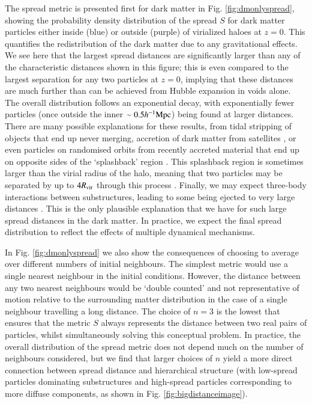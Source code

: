The spread metric is presented first for dark matter in Fig.
\ref{fig:dmonlyspread}, showing the probability density distribution of the
spread $S$ for dark matter particles either inside (blue) or outside (purple)
of virialized haloes at $z=0$. This quantifies the redistribution of the dark
matter due to any gravitational effects. We see here that the largest spread
distances are significantly larger than any of the characteristic distances
shown in this figure; this is even compared to the largest separation for any
two particles at $z=0$, implying that these distances are much further than
can be achieved from Hubble expansion in voids alone. The overall
distribution follows an exponential decay, with exponentially fewer particles
(once outside the inner $\sim 0.5 h^{-1}{\rm Mpc}{}$) being found at larger distances.
There are many possible explanations for these results, from tidal stripping
of objects that end up never merging, accretion of dark matter from
satellites \citep[see e.g. the effects in ][]{VandenBosch2018}, or even
particles on randomised orbits from recently accreted material that end up on
opposite sides of the `splashback' region \citep{Diemer2014, Adhikari2014}.
This splashback region is sometimes larger than the virial radius of the
halo, meaning that two particles may be separated by up to $4R_{\rm vir}$
through this process \citep{Diemer2017a}. Finally, we may expect three-body
interactions between substructures, leading to some being ejected to very
large distances \citep[up to $6R_{\rm vir}$; see][]{Ludlow2009}. This is the
only plausible explanation that we have for such large spread distances in
the dark matter. In practice, we expect the final spread distribution to
reflect the effects of multiple dynamical mechanisms.

In Fig. \ref{fig:dmonlyspread} we also show the consequences of choosing to
average over different numbers of initial neighbours. The simplest metric
would use a single nearest neighbour in the initial conditions. However, the
distance between any two nearest neighbours would be ‘double counted’ and not
representative of motion relative to the surrounding matter distribution in
the case of a single neighbour travelling a long distance. The choice of
$n=3$ is the lowest that ensures that the metric $S$ always represents the
distance between two real pairs of particles, whilst simultaneously solving
this conceptual problem. In practice, the overall distribution of the spread
metric does not depend much on the number of neighbours considered, but we
find that larger choices of $n$ yield a more direct connection between spread
distance and hierarchical structure (with low-spread particles dominating
substructures and high-spread particles corresponding to more diffuse
components, as shown in Fig. \ref{fig:bigdistanceimage}).

